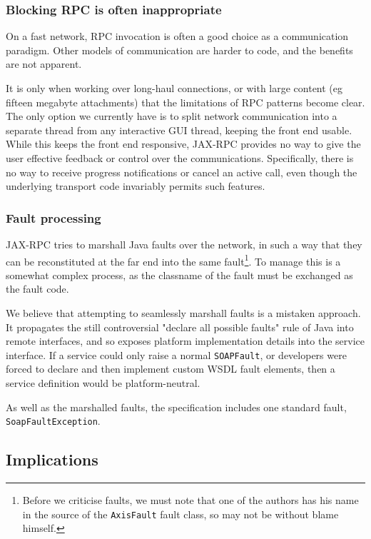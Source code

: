 \subsubsection{Blocking RPC is often inappropriate}

On a fast network, RPC invocation is often a good choice as a
communication paradigm. Other models of communication are harder to
code, and the benefits are not apparent.

It is only when working over long-haul connections, or with large
content (eg fifteen megabyte attachments) that the limitations
of RPC patterns become clear. The only option we currently have is to
split network communication into a separate thread from any
interactive GUI thread, keeping the front end usable. While this keeps
the front end responsive, JAX-RPC provides no way to give the user
effective feedback or control over the communications. Specifically,
there is no way to receive progress notifications or cancel an active
call, even though the underlying transport code invariably permits
such features.

\subsubsection{Fault processing}

JAX-RPC tries to marshall Java faults over the network, in such a way
that they can be reconstituted at the far end into the same
fault\footnote{Before we criticise faults, we must note that one of
the authors has his name in the source of the {\tt AxisFault} fault
class, so may not be without blame himself.}. To manage this is a
somewhat complex process, as the classname of the fault must be
exchanged as the fault code.

We believe that attempting to seamlessly marshall faults is a mistaken
approach.  It propagates the still controversial "declare all possible
faults" rule of Java into remote interfaces, and so exposes platform
implementation details into the service interface. If a service could
only raise a normal {\tt SOAPFault}, or developers were forced to
declare and then implement custom WSDL fault elements, then a service
definition would be platform-neutral.

As well as the marshalled faults, the specification includes one
standard fault, {\tt SoapFaultException}.

\subsection{Implications}

